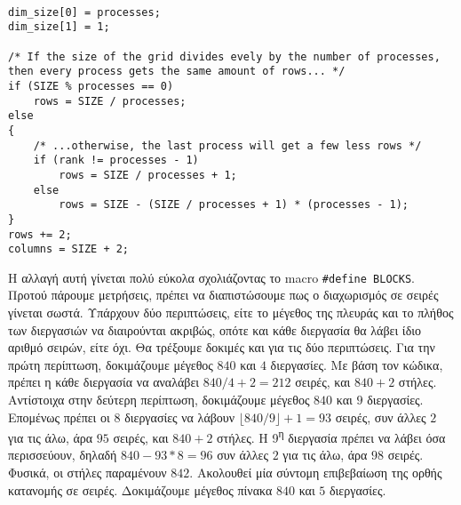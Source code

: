 \begin{tcolorbox}
\begin{verbatim}

dim_size[0] = processes;
dim_size[1] = 1;

/* If the size of the grid divides evely by the number of processes, then every process gets the same amount of rows... */
if (SIZE % processes == 0)
    rows = SIZE / processes;
else
{
    /* ...otherwise, the last process will get a few less rows */
    if (rank != processes - 1)
        rows = SIZE / processes + 1;
    else
        rows = SIZE - (SIZE / processes + 1) * (processes - 1);
}
rows += 2;
columns = SIZE + 2;
\end{verbatim}
\end{tcolorbox}

\clearpage

\begin{multicols}{2}
Η αλλαγή αυτή γίνεται πολύ εύκολα σχολιάζοντας το macro \texttt{#define BLOCKS}. Προτού πάρουμε μετρήσεις, πρέπει να διαπιστώσουμε πως ο διαχωρισμός σε σειρές γίνεται σωστά. Υπάρχουν δύο περιπτώσεις, είτε το μέγεθος της πλευράς και το πλήθος των διεργασιών να διαιρούνται ακριβώς, οπότε και κάθε διεργασία θα λάβει ίδιο αριθμό σειρών, είτε όχι. Θα τρέξουμε δοκιμές και για τις δύο περιπτώσεις. Για την πρώτη περίπτωση, δοκιμάζουμε μέγεθος $840$ και $4$ διεργασίες. Με βάση τον κώδικα, πρέπει η κάθε διεργασία να αναλάβει $840 / 4 + 2 = 212$ σειρές, και $840 + 2$ στήλες. Αντίστοιχα στην δεύτερη περίπτωση, δοκιμάζουμε μέγεθος $840$ και $9$ διεργασίες. Επομένως πρέπει οι $8$ διεργασίες να λάβουν $\lfloor 840 / 9 \rfloor + 1 = 93$ σειρές, συν άλλες $2$ για τις άλω, άρα $95$ σειρές, και $840 + 2$ στήλες. Η 9\textsuperscript{η} διεργασία πρέπει να λάβει όσα περισσεύουν, δηλαδή $840 - 93 * 8 = 96$ συν άλλες $2$ για τις άλω, άρα $98$ σειρές. Φυσικά, οι στήλες παραμένουν $842$. Ακολουθεί μία σύντομη επιβεβαίωση της ορθής κατανομής σε σειρές. Δοκιμάζουμε μέγεθος πίνακα $840$ και $5$ διεργασίες. \par
\end{multicols}

